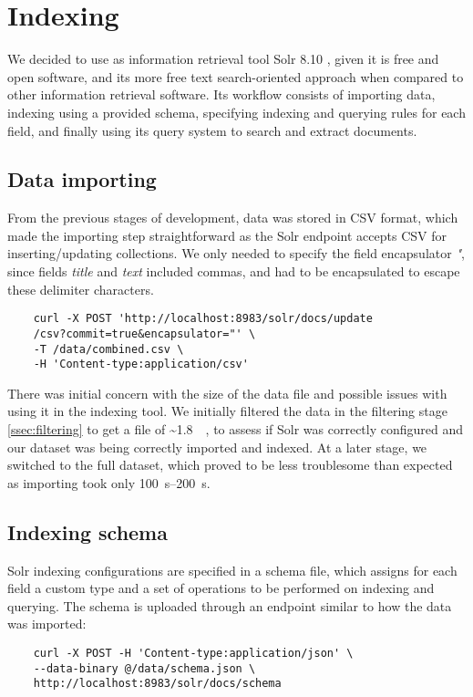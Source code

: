 \documentclass[sigconf, authorversion]{acmart}
\begin{document}
\section{Indexing}
We decided to use as information retrieval tool Solr 8.10 \cite{solrDocs}, given it is free and open software, and its more free text search-oriented approach when compared to other information retrieval software. Its workflow consists of importing data, indexing using a provided schema, specifying indexing and querying rules for each field, and finally using its query system to search and extract documents.

\subsection{Data importing} \label{ssec:data-importing}
From the previous stages of development, data was stored in CSV format, which made the importing step straightforward as the Solr endpoint accepts CSV for inserting/updating collections. We only needed to specify the field encapsulator \textit{"}, since fields \textit{title} and \textit{text} included commas, and had to be encapsulated to escape these delimiter characters.
\begin{verbatim} 
    curl -X POST 'http://localhost:8983/solr/docs/update
    /csv?commit=true&encapsulator="' \
    -T /data/combined.csv \
    -H 'Content-type:application/csv'
\end{verbatim}

There was initial concern with the size of the data file and possible issues with using it in the indexing tool. We initially filtered the data in the filtering stage \ref{ssec:filtering} to get a file of \textasciitilde\SI{1.8}{\mega\byte}, to assess if Solr was correctly configured and our dataset was being correctly imported and indexed. At a later stage, we switched to the full dataset, which proved to be less troublesome than expected as importing took only \SIrange{100}{200}{\second}.

\subsection{Indexing schema}
Solr indexing configurations are specified in a schema file, which assigns for each field a custom type and a set of operations to be performed on indexing and querying. The schema is uploaded through an endpoint similar to how the data was imported:
\begin{verbatim}
    curl -X POST -H 'Content-type:application/json' \
    --data-binary @/data/schema.json \
    http://localhost:8983/solr/docs/schema
\end{verbatim}
\end{document}
